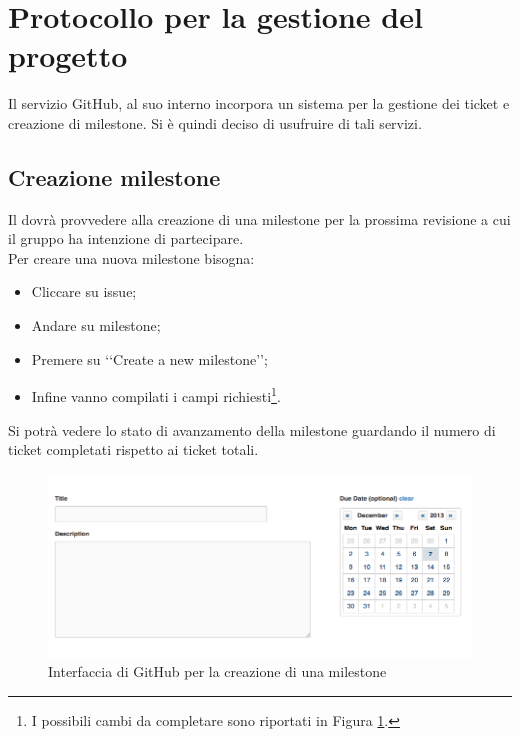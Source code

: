 \section{Protocollo per la gestione del progetto}
\label{protocollo}
Il servizio GitHub\glossario{}, al suo interno incorpora un sistema per la gestione dei ticket e creazione di milestone\glossario{}. Si è quindi deciso di usufruire di tali servizi.
\subsection{Creazione milestone}
\label{milestone}
Il \projectManager{} dovrà provvedere alla creazione di una milestone\glossario{} per la prossima revisione a cui il gruppo \authorName{} ha intenzione di partecipare.
\\Per creare una nuova milestone\glossario{} bisogna:
\begin{itemize}
\item Cliccare su issue;
\item Andare su milestone\glossario{};
\item Premere su \lq\lq{}Create a new milestone\glossario{}\rq\rq{};
\item Infine vanno compilati i campi richiesti\footnote{I possibili cambi da completare sono riportati in Figura \ref{github_milestone}.}.
\end{itemize}
Si potrà vedere lo stato di avanzamento della milestone\glossario{} guardando il numero di ticket completati rispetto ai ticket totali.
\begin{figure}[h]
	\centering
	\includegraphics[width=15cm]{./content/Immagini/Screen1.png}
	\caption{Interfaccia di GitHub per la creazione di una milestone}
	\label{github_milestone}
\end{figure}
\pagebreak
